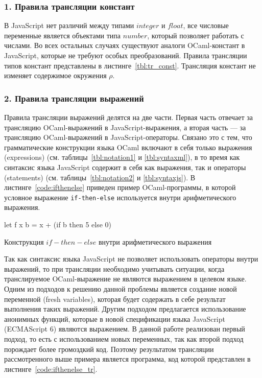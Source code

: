 \documentclass[12pt]{matmex-diploma}
\begin{document}
\subsubsection*{1. Правила трансляции констант}

В JavaScript нет различий между типами $integer$ и $float$, все числовые переменные является объектами типа $number$, который позволяет работать с числами. Во всех остальных случаях существуют аналоги OCaml-констант в JavaScript, которые не требуют особых преобразований. Правила трансляции типов констант представлены в листинге~\ref{tbl:tr_const}. Трансляция констант не изменяет содержимое окружения $\rho$.

\subsubsection*{2. Правила трансляции выражений}

 Правила трансляции выражений делятся на две части. Первая часть отвечает за трансляцию OCaml-выражений в JavaScript-выражения, а вторая часть --- за трансляцию OCaml-выражений в JavaScript-операторы. Связано это с тем, что грамматические конструкции языка OCaml включают в себя только выражения (expressions) (см. таблицы~\ref{tbl:notation1} и \ref{tbl:syntaxml}), в то время как синтаксис языка JavaScript содержит в себя как выражения, так и операторы (statements) (см. таблицы~\ref{tbl:notation2} и \ref{tbl:syntaxjs}). В листинге~\ref{code:ifthenelse} приведен пример OCaml-программы, в которой условное выражение \verb|if-then-else| используется внутри арифметического выражения. 

\begin{listing}
\begin{pyglist}[language=ocaml,numbers=none,numbersep=5pt, fontsize=\small]
let f x b = x + (if b then 5 else 0)
\end{pyglist}
\caption{Конструкция $if-then-else$ внутри арифметического выражения}
\label{code:ifthenelse}
\end{listing}

Так как синтаксис языка JavaScript не позволяет использовать операторы внутри выражений, то при трансляции необходимо учитывать ситуации, когда транслируемое OCaml-выражение не являются выражением в целевом языке. Одним из подходов к решению данной проблемы является создание новой переменной (fresh variables), которая будет содержать в себе результат выполнения таких выражений. Другим подходом предлагается использование анонимных функций, которые в новой спецификации языка JavaScript (ECMAScript 6) являются выражением. В данной работе реализован первый подход, то есть с использованием новых переменных, так как второй подход порождает более громоздкий код. Поэтому результатом трансляции рассмотренного выше примера является программа, код которой представлен в листинге~\ref{code:ifthenelse_tr}.
\end{document}
